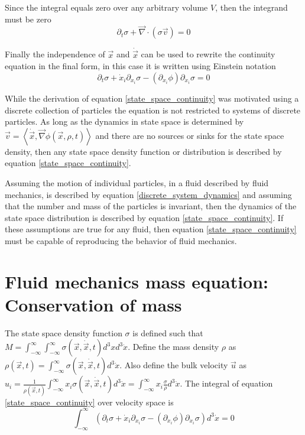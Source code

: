 \documentclass[%
 reprint,
 amsmath,amssymb,
 aps,
]{revtex4-1}
\newcommand{\dvec}[1]{\dot{\vec{#1}}}
\newcommand{\grad}{\vec{\nabla}}
\newcommand{\intVdot}[1]{\int_{-\infty}^{\infty} #1 d^3\dot{x}}
\newcommand{\intVVdot}[1]{\int_{-\infty}^{\infty}\int_{-\infty}^{\infty} #1 d^3xd^3\dot{x}}
\begin{document}
Since the integral equals zero over any arbitrary volume $V$, then the integrand must be zero
\[
\partial_t \sigma + \grad\cdot\left(\sigma\vec{v}\right)=0
\]

Finally the independence of $\vec{x}$ and $\dvec{x}$ can be used to rewrite the continuity equation in the final form, in this case it is written using Einstein notation
\begin{equation}
\partial_t \sigma + \dot{x}_i\partial_{x_i}\sigma-\left(\partial_{x_i}\phi\right)\partial_{\dot{x}_i}\sigma=0
\label{state_space_continuity}
\end{equation}

While the derivation of equation \eqref{state_space_continuity} was motivated using a discrete collection of particles the equation is not restricted to systems of discrete particles. As long as the dynamics in state space is determined by $\vec{v}=\left\langle\dvec{x}, \grad\phi(\vec{x}, \rho, t)\right\rangle$ and there are no sources or sinks for the state space density, then any state space density function or distribution is described by equation \eqref{state_space_continuity}.

Assuming the motion of individual particles, in a fluid described by fluid mechanics, is described by equation \eqref{discrete_system_dynamics} and assuming that the number and mass of the particles is invariant, then the dynamics of the state space distribution is described by equation \eqref{state_space_continuity}. If these assumptions are true for any fluid, then equation \eqref{state_space_continuity} must be capable of reproducing the behavior of fluid mechanics.

\section{Fluid mechanics mass equation: Conservation of mass}
The state space density function $\sigma$ is defined such that $M=\intVVdot{\sigma(\vec{x}, \dvec{x}, t)}$. Define the mass density $\rho$ as $\rho(\vec{x}, t)=\intVdot{\sigma(\vec{x}, \dvec{x}, t)}$. Also define the bulk velocity $\vec{u}$ as $u_i=\frac{1}{\rho(\vec{x}, t)}\intVdot{x_i\sigma(\vec{x}, \dvec{x}, t)}=\intVdot{x_i\frac{\sigma}{\rho}}$. The integral of equation \eqref{state_space_continuity} over velocity space is
\[
\intVdot{\left(\partial_t \sigma + \dot{x}_i\partial_{x_i}\sigma-\left(\partial_{x_i}\phi\right)\partial_{\dot{x}_i}\sigma\right)}=0
\]
\end{document}
